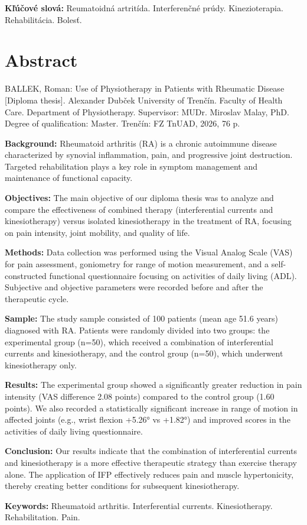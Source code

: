 \textbf{Kľúčové slová:} Reumatoidná artritída. Interferenčné prúdy. Kinezioterapia. Rehabilitácia. Bolesť.

\clearpage

\chapter*{Abstract}

BALLEK, Roman: Use of Physiotherapy in Patients with Rheumatic Disease [Diploma thesis]. Alexander Dubček University of Trenčín. Faculty of Health Care. Department of Physiotherapy. Supervisor: MUDr. Miroslav Malay, PhD. Degree of qualification: Master. Trenčín: FZ TnUAD, 2026, 76 p.

\textbf{Background:} Rheumatoid arthritis (RA) is a chronic autoimmune disease characterized by synovial inflammation, pain, and progressive joint destruction. Targeted rehabilitation plays a key role in symptom management and maintenance of functional capacity.

\textbf{Objectives:} The main objective of our diploma thesis was to analyze and compare the effectiveness of combined therapy (interferential currents and kinesiotherapy) versus isolated kinesiotherapy in the treatment of RA, focusing on pain intensity, joint mobility, and quality of life.

\textbf{Methods:} Data collection was performed using the Visual Analog Scale (VAS) for pain assessment, goniometry for range of motion measurement, and a self-constructed functional questionnaire focusing on activities of daily living (ADL). Subjective and objective parameters were recorded before and after the therapeutic cycle.

\textbf{Sample:} The study sample consisted of 100 patients (mean age 51.6 years) diagnosed with RA. Patients were randomly divided into two groups: the experimental group (n=50), which received a combination of interferential currents and kinesiotherapy, and the control group (n=50), which underwent kinesiotherapy only.

\textbf{Results:} The experimental group showed a significantly greater reduction in pain intensity (VAS difference 2.08 points) compared to the control group (1.60 points). We also recorded a statistically significant increase in range of motion in affected joints (e.g., wrist flexion +5.26° vs +1.82°) and improved scores in the activities of daily living questionnaire.

\textbf{Conclusion:} Our results indicate that the combination of interferential currents and kinesiotherapy is a more effective therapeutic strategy than exercise therapy alone. The application of IFP effectively reduces pain and muscle hypertonicity, thereby creating better conditions for subsequent kinesiotherapy.

\textbf{Keywords:} Rheumatoid arthritis. Interferential currents. Kinesiotherapy. Rehabilitation. Pain.

\clearpage
